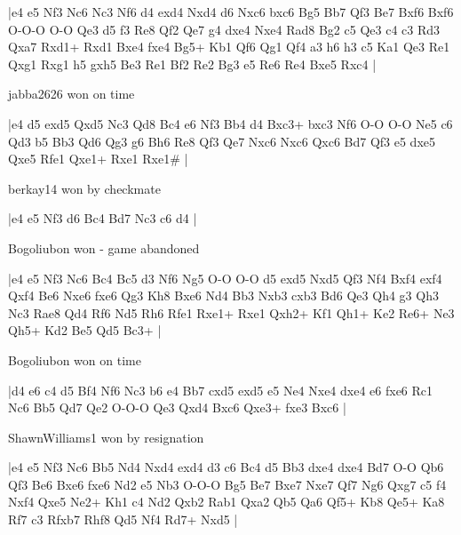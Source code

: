 \makegametitle
|e4 e5 Nf3 Nc6 Nc3 Nf6 d4 exd4 Nxd4 d6 Nxc6 bxc6 Bg5 Bb7 Qf3 Be7 Bxf6 Bxf6 O-O-O O-O Qe3 d5 f3 Re8 Qf2 Qe7 g4 dxe4 Nxe4 Rad8 Bg2 c5 Qe3 c4 c3 Rd3 Qxa7 Rxd1+ Rxd1 Bxe4 fxe4 Bg5+ Kb1 Qf6 Qg1 Qf4 a3 h6 h3 c5 Ka1 Qe3 Re1 Qxg1 Rxg1 h5 gxh5 Be3 Re1 Bf2 Re2 Bg3 e5 Re6 Re4 Bxe5 Rxc4  |

\showboard

jabba2626 won on time

\makegametitle
|e4 d5 exd5 Qxd5 Nc3 Qd8 Bc4 e6 Nf3 Bb4 d4 Bxc3+ bxc3 Nf6 O-O O-O Ne5 c6 Qd3 b5 Bb3 Qd6 Qg3 g6 Bh6 Re8 Qf3 Qe7 Nxc6 Nxc6 Qxc6 Bd7 Qf3 e5 dxe5 Qxe5 Rfe1 Qxe1+ Rxe1 Rxe1\#  |

\showboard

berkay14 won by checkmate

\makegametitle
|e4 e5 Nf3 d6 Bc4 Bd7 Nc3 c6 d4  |

\showboard

Bogoliubon won - game abandoned

\makegametitle
|e4 e5 Nf3 Nc6 Bc4 Bc5 d3 Nf6 Ng5 O-O O-O d5 exd5 Nxd5 Qf3 Nf4 Bxf4 exf4 Qxf4 Be6 Nxe6 fxe6 Qg3 Kh8 Bxe6 Nd4 Bb3 Nxb3 cxb3 Bd6 Qe3 Qh4 g3 Qh3 Nc3 Rae8 Qd4 Rf6 Nd5 Rh6 Rfe1 Rxe1+ Rxe1 Qxh2+ Kf1 Qh1+ Ke2 Re6+ Ne3 Qh5+ Kd2 Be5 Qd5 Bc3+  |

\showboard

Bogoliubon won on time

\makegametitle
|d4 e6 c4 d5 Bf4 Nf6 Nc3 b6 e4 Bb7 cxd5 exd5 e5 Ne4 Nxe4 dxe4 e6 fxe6 Rc1 Nc6 Bb5 Qd7 Qe2 O-O-O Qe3 Qxd4 Bxc6 Qxe3+ fxe3 Bxc6  |

\showboard

ShawnWilliams1 won by resignation

\makegametitle
|e4 e5 Nf3 Nc6 Bb5 Nd4 Nxd4 exd4 d3 c6 Bc4 d5 Bb3 dxe4 dxe4 Bd7 O-O Qb6 Qf3 Be6 Bxe6 fxe6 Nd2 e5 Nb3 O-O-O Bg5 Be7 Bxe7 Nxe7 Qf7 Ng6 Qxg7 c5 f4 Nxf4 Qxe5 Ne2+ Kh1 c4 Nd2 Qxb2 Rab1 Qxa2 Qb5 Qa6 Qf5+ Kb8 Qe5+ Ka8 Rf7 c3 Rfxb7 Rhf8 Qd5 Nf4 Rd7+ Nxd5  |

\showboard

